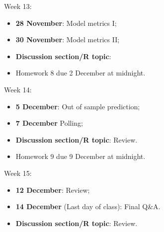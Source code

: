 \documentclass[12pt]{article}
\begin{document}
\noindent Week 13:
\begin{itemize}
\item \textbf{28 November}: Model metrics I;
\item \textbf{30 November}: Model metrics II;
\item \textbf{Discussion section/R topic}:
\item Homework 8 due 2 December at midnight.
\end{itemize}

\noindent Week 14:
\begin{itemize}
\item \textbf{5 December}: Out of sample prediction;
\item \textbf{7 December} Polling;
\item \textbf{Discussion section/R topic}: Review.
\item Homework 9 due 9 December at midnight.
\end{itemize}

\noindent Week 15:
\begin{itemize}
\item \textbf{12 December}: Review;
\item \textbf{14 December} (Last day of class): Final Q\&A.
\item \textbf{Discussion section/R topic}: Review.
\end{itemize}



\end{document}
